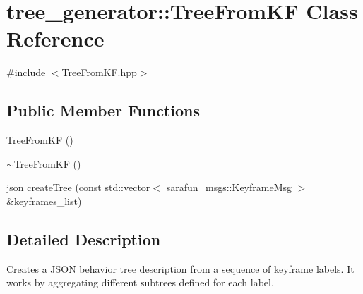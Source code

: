 \hypertarget{classtree__generator_1_1TreeFromKF}{\section{tree\-\_\-generator\-:\-:Tree\-From\-K\-F Class Reference}
\label{classtree__generator_1_1TreeFromKF}
}


{\ttfamily \#include $<$Tree\-From\-K\-F.\-hpp$>$}

\subsection*{Public Member Functions}
\begin{DoxyCompactItemize}
\item 
\hyperlink{classtree__generator_1_1TreeFromKF_ae29828b16945e36e961283811c25e082}{Tree\-From\-K\-F} ()
\item 
\hyperlink{classtree__generator_1_1TreeFromKF_aaf65aa5f86c50c7496494e9338a10931}{$\sim$\-Tree\-From\-K\-F} ()
\item 
\hyperlink{parse__tree_8h_ab701e3ac61a85b337ec5c1abaad6742d}{json} \hyperlink{classtree__generator_1_1TreeFromKF_ac056f11be0625689ab20954944443755}{create\-Tree} (const std\-::vector$<$ sarafun\-\_\-msgs\-::\-Keyframe\-Msg $>$ \&keyframes\-\_\-list)
\end{DoxyCompactItemize}


\subsection{Detailed Description}
Creates a J\-S\-O\-N behavior tree description from a sequence of keyframe labels. It works by aggregating different subtrees defined for each label. 

